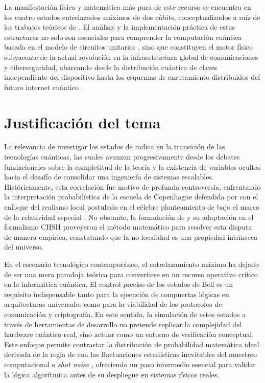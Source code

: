 \documentclass[11pt,a4paper,spanish]{book}
\begin{document}
La manifestación física y matemática más pura de este recurso se encuentra en los cuatro estados entrelazados máximos de dos cúbits, conceptualizados a raíz de los trabajos teóricos de \cite{bell1964}. El análisis y la implementación práctica de estas estructuras no solo son esenciales para comprender la computación cuántica basada en el modelo de circuitos unitarios \citep{deutsch1989}, sino que constituyen el motor físico subyacente de la actual revolución en la infraestructura global de comunicaciones y ciberseguridad, abarcando desde la distribución cuántica de claves independiente del dispositivo \citep{ekert1991, masanes2010} hasta los esquemas de enrutamiento distribuidos del futuro internet cuántico \citep{kimble2008}.

\section{Justificación del tema}
La relevancia de investigar los estados de \cite{bell1964} radica en la transición de las tecnologías cuánticas, las cuales avanzan progresivamente desde los debates fundacionales sobre la completitud de la teoría y la existencia de variables ocultas hacia el desafío de consolidar una ingeniería de sistemas escalables. Históricamente, esta correlación fue motivo de profunda controversia, enfrentando la interpretación probabilística de la escuela de Copenhague defendida por \cite{bohr1935} con el enfoque del realismo local postulado en el célebre planteamiento de \cite{einstein1935} bajo el marco de la relatividad especial \citep{einstein1905}. No obstante, la formulación de \cite{bell1964} y su adaptación en el formalismo CHSH \citep{clauser1969} proveyeron el método matemático para resolver esta disputa de manera empírica, constatando que la no localidad es una propiedad intrínseca del universo.

En el escenario tecnológico contemporáneo, el entrelazamiento máximo \citep{schrodinger1935} ha dejado de ser una mera paradoja teórica para convertirse en un recurso operativo crítico en la informática cuántica. El control preciso de los estados de Bell es un requisito indispensable tanto para la ejecución de compuertas lógicas en arquitecturas universales \citep{barenco1995} como para la viabilidad de los protocolos de comunicación y criptografía. En este sentido, la simulación de estos estados a través de herramientas de desarrollo no pretende replicar la complejidad del hardware cuántico real, sino actuar como un entorno de verificación conceptual. Este enfoque permite contrastar la distribución de probabilidad matemática ideal derivada de la regla de \cite{born1926} con las fluctuaciones estadísticas inevitables del muestreo computacional o \emph{shot noise} \citep{schottky1918}, ofreciendo un paso intermedio esencial para validar la lógica algorítmica antes de su despliegue en sistemas físicos reales.
\end{document}
